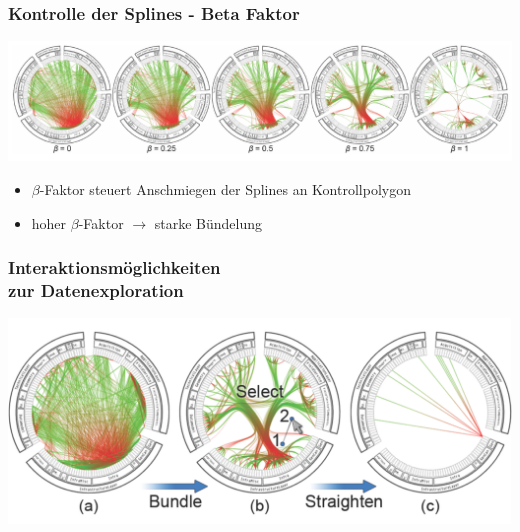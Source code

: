 \documentclass[11pt]{beamer}
\begin{document}
\begin{frame}
\frametitle{Kontrolle der Splines - Beta Faktor}
\includegraphics[scale=0.35]{./Algorithm_BetaFactor_Results.png}
\begin{itemize}
\bigskip
\item $\beta$-Faktor steuert Anschmiegen der Splines an Kontrollpolygon
\item hoher $\beta$-Faktor $\rightarrow$ starke Bündelung
\end{itemize}
\end{frame}

\begin{frame}
\frametitle{Interaktionsmöglichkeiten\\ zur Datenexploration}
\includegraphics[scale=0.30]{./Algorithm_Interaction.png}
\end{frame}
\end{document}
